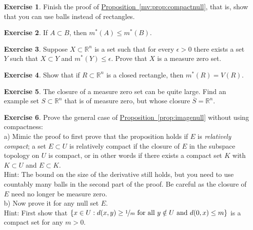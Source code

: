 \documentclass[12pt]{book}
\newcommand{\R}{{\mathbb{R}}}
\newcommand{\myindex}[1]{#1\index{#1}}
\theoremstyle{plain}
\theoremstyle{remark}
\theoremstyle{definition}
\theoremstyle{exercise}
\newtheorem{exercise}{Exercise}[section]
\theoremstyle{example}
\newcommand{\propref}[1]{\hyperref[#1]{Proposition~\ref*{#1}}}
\begin{document}


\begin{exercise}
Finish the proof of \propref{mv:prop:compactnull}, that is, show that you
can use balls instead of rectangles.
\end{exercise}

\begin{exercise}
If $A \subset B$, then $m^*(A) \leq m^*(B)$.
\end{exercise}

\begin{exercise}
Suppose $X \subset \R^n$ is a set such that for every $\epsilon > 0$
there exists a set $Y$ such that $X \subset Y$ and $m^*(Y) \leq \epsilon$.
Prove that $X$ is a measure zero set.
\end{exercise}

\begin{exercise}
Show that if $R \subset \R^n$ is a closed rectangle, then $m^*(R) = V(R)$.
\end{exercise}

\begin{exercise}
The closure of a measure zero set can be quite large.  Find an example
set $S \subset \R^n$ that is of measure zero, but whose closure
$\overline{S} = \R^n$.
\end{exercise}

\begin{exercise}
Prove the general case of  \propref{prop:imagenull} without using compactness:\\
a) Mimic the proof to first prove that the proposition holds if $E$ is
\emph{\myindex{relatively compact}}; a set $E \subset U$ is relatively
compact if the closure of $E$ in the subspace topology on $U$ is compact,
or in other words if there exists a compact set $K$ with $K \subset U$
and $E \subset K$.\\
Hint: The bound on the size of the derivative still holds, but you need
to use countably many balls in the second part of the proof.
Be careful as the closure of $E$ need no
longer be measure zero.\\
b) Now prove it for any null set $E$.\\
Hint: First show that $\{ x \in U : d(x,y) \geq
\nicefrac{1}{m} \text{ for all $y \notin U$ and } d(0,x) \leq m \}$ is a compact set for
any $m > 0$.
\end{exercise}
\end{document}
